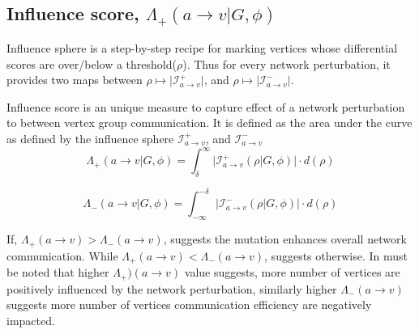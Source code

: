 \documentclass{article}
\begin{document}
\subsection{Influence score, $\Lambda_{+}(a\rightarrow v\vert G, \phi)$}\label{sec:infscore}
Influence sphere is a step-by-step recipe for marking vertices whose differential scores are over/below a threshold($\rho$). Thus for every network perturbation, it provides two maps between $\rho \mapsto \vert \mathcal{I}^{+}_{a\rightarrow v}\vert$, and $\rho \mapsto \vert \mathcal{I}^{-}_{a\rightarrow v} \vert$.
\par
Influence score is an unique measure to capture effect of a network perturbation to between vertex group communication. It is defined as the area under the curve as defined by the influence sphere $\mathcal{I}^{+}_{a\rightarrow v}$, and $\mathcal{I}^{-}_{a\rightarrow v}$
\begin{equation*}
    \Lambda_{+}(a\rightarrow v\vert G, \phi) = \int^{\infty}_{\delta} \vert \mathcal{I}^{+}_{a\rightarrow v}(\rho\vert G,\phi)\vert\cdot d(\rho)
\end{equation*}

\begin{equation*}
    \Lambda_{-}(a\rightarrow v\vert G, \phi) = \int^{-\delta}_{-\infty} \vert \mathcal{I}^{-}_{a\rightarrow v}(\rho\vert G,\phi)\vert \cdot d(\rho)
\end{equation*}

If, $\Lambda_{+}(a\rightarrow v) > \Lambda_{-}(a\rightarrow v)$, suggests the mutation enhances overall network communication. While $\Lambda_{+}(a\rightarrow v) < \Lambda_{-}(a\rightarrow v)$, suggests otherwise. In must be noted that higher $\Lambda_{+})(a\rightarrow v)$ value suggests, more number of vertices are positively influenced by the network perturbation, similarly higher $\Lambda_{-}(a\rightarrow v)$ suggests more number of vertices communication efficiency are negatively impacted.
\end{document}
